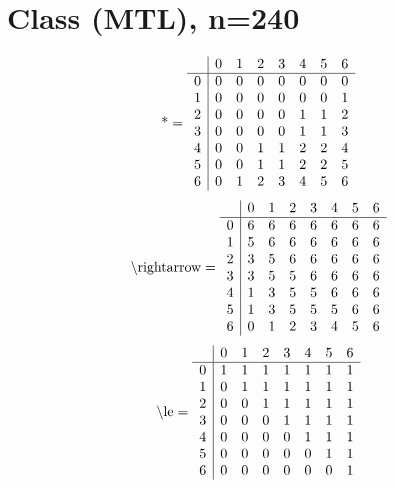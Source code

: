 \documentclass[11pt]{article}
\begin{document}
\section{Class (MTL), n=240}
\[\text{*} = 
\begin{array}{r | r r r r r r r}
 & 0 & 1 & 2 & 3 & 4 & 5 & 6 \\ \hline
0 & 0 & 0 & 0 & 0 & 0 & 0 & 0 \\
1 & 0 & 0 & 0 & 0 & 0 & 0 & 1 \\
2 & 0 & 0 & 0 & 0 & 1 & 1 & 2 \\
3 & 0 & 0 & 0 & 0 & 1 & 1 & 3 \\
4 & 0 & 0 & 1 & 1 & 2 & 2 & 4 \\
5 & 0 & 0 & 1 & 1 & 2 & 2 & 5 \\
6 & 0 & 1 & 2 & 3 & 4 & 5 & 6 \\
\end{array}
\]
\[\text{\textbackslash rightarrow} = 
\begin{array}{r | r r r r r r r}
 & 0 & 1 & 2 & 3 & 4 & 5 & 6 \\ \hline
0 & 6 & 6 & 6 & 6 & 6 & 6 & 6 \\
1 & 5 & 6 & 6 & 6 & 6 & 6 & 6 \\
2 & 3 & 5 & 6 & 6 & 6 & 6 & 6 \\
3 & 3 & 5 & 5 & 6 & 6 & 6 & 6 \\
4 & 1 & 3 & 5 & 5 & 6 & 6 & 6 \\
5 & 1 & 3 & 5 & 5 & 5 & 6 & 6 \\
6 & 0 & 1 & 2 & 3 & 4 & 5 & 6 \\
\end{array}
\]
\[\text{\textbackslash le} = 
\begin{array}{r | r r r r r r r}
 & 0 & 1 & 2 & 3 & 4 & 5 & 6 \\ \hline
0 & 1 & 1 & 1 & 1 & 1 & 1 & 1 \\
1 & 0 & 1 & 1 & 1 & 1 & 1 & 1 \\
2 & 0 & 0 & 1 & 1 & 1 & 1 & 1 \\
3 & 0 & 0 & 0 & 1 & 1 & 1 & 1 \\
4 & 0 & 0 & 0 & 0 & 1 & 1 & 1 \\
5 & 0 & 0 & 0 & 0 & 0 & 1 & 1 \\
6 & 0 & 0 & 0 & 0 & 0 & 0 & 1 \\
\end{array}
\]
\end{document}
